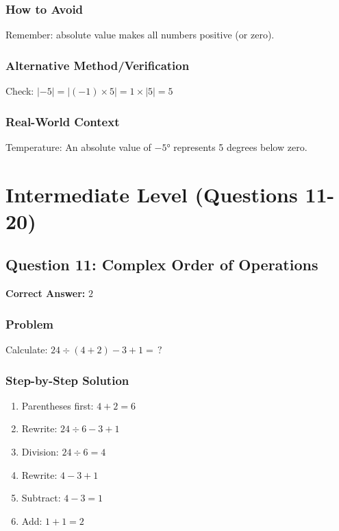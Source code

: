 \documentclass[12pt,a4paper]{article}
\begin{document}
\subsubsection*{How to Avoid}
Remember: absolute value makes all numbers positive (or zero).

\subsubsection*{Alternative Method/Verification}
Check: $|-5| = |(-1) \times 5| = 1 \times |5| = 5$ 

\subsubsection*{Real-World Context}
Temperature: An absolute value of $-5°$ represents 5 degrees below zero.

\newpage

\section{Intermediate Level (Questions 11-20)}

\subsection*{Question 11: Complex Order of Operations}

\textbf{Correct Answer:} $2$

\subsubsection*{Problem}
Calculate: $24 \div (4 + 2) - 3 + 1 = \,?$

\subsubsection*{Step-by-Step Solution}
\begin{enumerate}
    \item Parentheses first: $4 + 2 = 6$
    \item Rewrite: $24 \div 6 - 3 + 1$
    \item Division: $24 \div 6 = 4$
    \item Rewrite: $4 - 3 + 1$
    \item Subtract: $4 - 3 = 1$
    \item Add: $1 + 1 = 2$
\end{enumerate}
\end{document}
